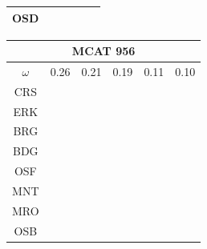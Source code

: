 \documentclass[12pt]{article}
\begin{document}
\begin{landscape}
\begin{figure}
{\begin{minipage}[c]{0.3\textwidth}
\begin{tabular}{|c|c|c|c|c|c|}
        OSD&\cellcolor[HTML]{FF7F00}&\cellcolor[HTML]{984EA3}&\cellcolor[HTML]{984EA3}&\cellcolor[HTML]{FF7F00}&\cellcolor[HTML]{FF7F00}\\ \hline %
\end{tabular}
\end{minipage}
\begin{minipage}[c]{0.3\textwidth}
\begin{tabular}{|c|c|c|c|c|c|}%
         \hline \multicolumn{6}{|c|}{MCAT 956} \\ \hline
         $\omega$&0.26&0.21&0.19&0.11&0.10\\ \hline %
        CRS&\cellcolor[HTML]{E41A1C}&\cellcolor[HTML]{E41A1C}&\cellcolor[HTML]{E41A1C}&\cellcolor[HTML]{E41A1C}&\cellcolor[HTML]{E41A1C}\\ \hline %
        ERK&\cellcolor[HTML]{E41A1C}&\cellcolor[HTML]{377EB8}&\cellcolor[HTML]{E41A1C}&\cellcolor[HTML]{377EB8}&\cellcolor[HTML]{E41A1C}\\ \hline %
        BRG&\cellcolor[HTML]{377EB8}&\cellcolor[HTML]{4DAF4A}&\cellcolor[HTML]{377EB8}&\cellcolor[HTML]{4DAF4A}&\cellcolor[HTML]{377EB8}\\ \hline %
        BDG&\cellcolor[HTML]{377EB8}&\cellcolor[HTML]{4DAF4A}&\cellcolor[HTML]{377EB8}&\cellcolor[HTML]{4DAF4A}&\cellcolor[HTML]{377EB8}\\ \hline %
        OSF&\cellcolor[HTML]{4DAF4A}&\cellcolor[HTML]{4DAF4A}&\cellcolor[HTML]{377EB8}&\cellcolor[HTML]{4DAF4A}&\cellcolor[HTML]{377EB8}\\ \hline %
        MNT&\cellcolor[HTML]{4DAF4A}&\cellcolor[HTML]{984EA3}&\cellcolor[HTML]{4DAF4A}&\cellcolor[HTML]{984EA3}&\cellcolor[HTML]{4DAF4A}\\ \hline %
        MRO&\cellcolor[HTML]{4DAF4A}&\cellcolor[HTML]{984EA3}&\cellcolor[HTML]{4DAF4A}&\cellcolor[HTML]{984EA3}&\cellcolor[HTML]{4DAF4A}\\ \hline %
        OSB&\cellcolor[HTML]{984EA3}&\cellcolor[HTML]{984EA3}&\cellcolor[HTML]{4DAF4A}&\cellcolor[HTML]{FF7F00}&\cellcolor[HTML]{984EA3}\\ \hline %

\end{tabular}
\end{minipage}}
\end{figure}
\end{landscape}
\end{document}
